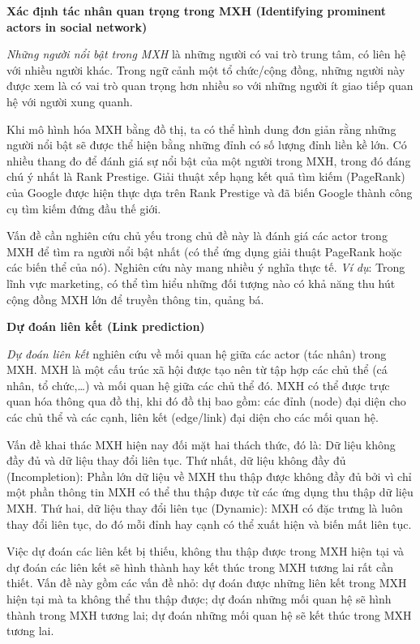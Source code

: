 \documentclass[12pt]{extarticle}
\begin{document}
			\par \textbf{Xác định tác nhân quan trọng trong MXH (Identifying prominent actors in social network)}
			\par \textit{Những người nổi bật trong MXH} là những người có vai trò trung tâm, có liên hệ với nhiều người khác. Trong ngữ cảnh một tổ chức/cộng đồng, những người này được xem là có vai trò quan trọng hơn nhiều so với những người ít giao tiếp quan hệ với người xung quanh.
			\par Khi mô hình hóa MXH bằng đồ thị, ta có thể hình dung đơn giản rằng những người nổi bật sẽ được thể hiện bằng những đỉnh có số lượng đỉnh liền kề lớn. Có nhiều thang đo để đánh giá sự nổi bật của một người trong MXH, trong đó đáng chú ý nhất là Rank Prestige. Giải thuật xếp hạng kết quả tìm kiếm (PageRank) của Google được hiện thực dựa trên Rank Prestige và đã biến Google thành công cụ tìm kiếm đứng đầu thế giới.
			\par Vấn đề cần nghiên cứu chủ yếu trong chủ đề này là đánh giá các actor trong MXH để tìm ra người nổi bật nhất (có thể ứng dụng giải thuật PageRank hoặc các biến thể của nó). Nghiên cứu này mang nhiều ý nghĩa thực tế. \textit{Ví dụ}: Trong lĩnh vực marketing, có thể tìm hiểu những đối tượng nào có khả năng thu hút cộng đồng MXH lớn để truyền thông tin, quảng bá.
			\par \textbf{Dự đoán liên kết (Link prediction)}
			\par \textit{Dự đoán liên kết} nghiên cứu về mối quan hệ giữa các actor (tác nhân) trong MXH. MXH là một cấu trúc xã hội được tạo nên từ tập hợp các chủ thể (cá nhân, tổ chức,…) và mối quan hệ giữa các chủ thể đó. MXH có thể được trực quan hóa thông qua đồ thị, khi đó đồ thị bao gồm: các đỉnh (node) đại diện cho các chủ thể và các cạnh, liên kết (edge/link) đại diện cho các mối quan hệ.
			\par Vấn đề khai thác MXH hiện nay đối mặt hai thách thức, đó là: Dữ liệu không đầy đủ và dữ liệu thay đổi liên tục. Thứ nhất, dữ liệu không đầy đủ (Incompletion): Phần lớn dữ liệu về MXH thu thập được không đầy đủ bởi vì chỉ một phần thông tin MXH có thể thu thập được từ các ứng dụng thu thập dữ liệu MXH. Thứ hai, dữ liệu thay đổi liên tục (Dynamic): MXH có đặc trưng là luôn thay đổi liên tục, do đó mỗi đỉnh hay cạnh có thể xuất hiện và biến mất liên tục.
			\par Việc dự đoán các liên kết bị thiếu, không thu thập được trong MXH hiện tại và dự đoán các liên kết sẽ hình thành hay kết thúc trong MXH tương lai rất cần thiết. Vấn đề này gồm các vấn đề nhỏ: dự đoán được những liên kết trong MXH hiện tại mà ta không thể thu thập được; dự đoán những mối quan hệ sẽ hình thành trong MXH tương lai; dự đoán những mối quan hệ sẽ kết thúc trong MXH tương lai.
\end{document}
